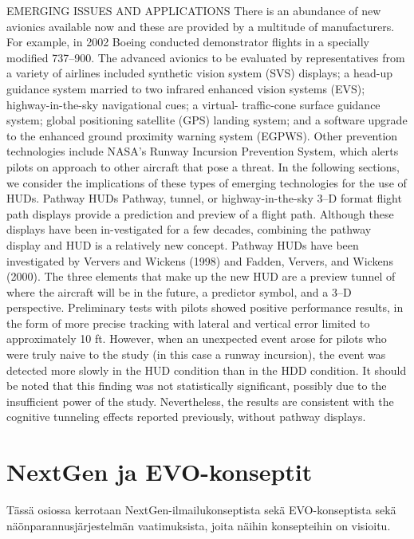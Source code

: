 \documentclass[utf8,bachelor,manualbib]{gradu3}
\begin{document}
EMERGING ISSUES AND APPLICATIONS
There is an abundance of new avionics available now and these are provided by
a multitude of manufacturers. For example, in 2002 Boeing conducted demonstrator
flights in a specially modified 737–900. The advanced avionics to be
evaluated by representatives from a variety of airlines included synthetic vision
system (SVS) displays; a head-up guidance system married to two infrared enhanced
vision systems (EVS); highway-in-the-sky navigational cues; a virtual-
traffic-cone surface guidance system; global positioning satellite (GPS)
landing system; and a software upgrade to the enhanced ground proximity warning
system (EGPWS). Other prevention technologies include NASA’s Runway
Incursion Prevention System, which alerts pilots on approach to other aircraft
that pose a threat. In the following sections, we consider the implications of
these types of emerging technologies for the use of HUDs.
Pathway HUDs
Pathway, tunnel, or highway-in-the-sky 3–D format flight path displays provide
a prediction and preview of a flight path. Although these displays have been in-vestigated for a few decades, combining the pathway display and HUD is a relatively
new concept.
Pathway HUDs have been investigated by Ververs and Wickens (1998) and
Fadden, Ververs, and Wickens (2000). The three elements that make up the new
HUD are a preview tunnel of where the aircraft will be in the future, a predictor
symbol, and a 3–D perspective. Preliminary tests with pilots showed positive performance
results, in the form of more precise tracking with lateral and vertical error
limited to approximately 10 ft. However, when an unexpected event arose for
pilots who were truly naive to the study (in this case a runway incursion), the event
was detected more slowly in the HUD condition than in the HDD condition. It
should be noted that this finding was not statistically significant, possibly due to
the insufficient power of the study. Nevertheless, the results are consistent with the
cognitive tunneling effects reported previously, without pathway displays. \citep{crawford2006}



\section{NextGen ja EVO-konseptit}

Tässä osiossa kerrotaan NextGen-ilmailukonseptista sekä EVO-konseptista sekä näönparannusjärjestelmän vaatimuksista, joita näihin konsepteihin on visioitu.
\end{document}

